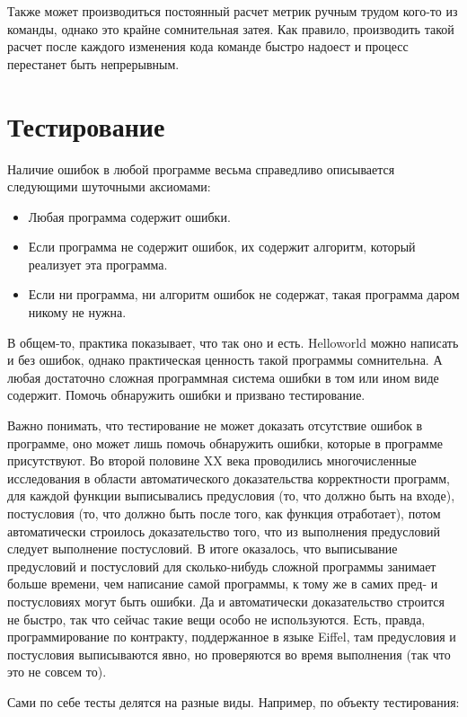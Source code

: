 \documentclass{../../text-style}
\begin{document}
Также может производиться постоянный расчет метрик ручным трудом кого-то из команды, однако это крайне сомнительная затея. Как правило, производить такой расчет после каждого изменения кода команде быстро надоест и процесс перестанет быть непрерывным.

\section{Тестирование}

Наличие ошибок в любой программе весьма справедливо описывается следующими шуточными аксиомами:

\begin{itemize}
    \item Любая программа содержит ошибки.
    \item Если программа не содержит ошибок, их содержит алгоритм, который реализует эта программа.
    \item Если ни программа, ни алгоритм ошибок не содержат, такая программа даром никому не нужна.
\end{itemize}

В общем-то, практика показывает, что так оно и есть. Helloworld можно написать и без ошибок, однако практическая ценность такой программы сомнительна. А любая достаточно сложная программная система ошибки в том или ином виде содержит. Помочь обнаружить ошибки и призвано тестирование.

Важно понимать, что тестирование не может доказать отсутствие ошибок в программе, оно может лишь помочь обнаружить ошибки, которые в программе присутствуют. Во второй половине XX века проводились многочисленные исследования в области автоматического доказательства корректности программ, для каждой функции выписывались предусловия (то, что должно быть на входе), постусловия (то, что должно быть после того, как функция отработает), потом автоматически строилось доказательство того, что из выполнения предусловий следует выполнение постусловий. В итоге оказалось, что выписывание предусловий и постусловий для сколько-нибудь сложной программы занимает больше времени, чем написание самой программы, к тому же в самих пред- и постусловиях могут быть ошибки. Да и автоматически доказательство строится не быстро, так что сейчас такие вещи особо не используются. Есть, правда, программирование по контракту, поддержанное в языке Eiffel, там предусловия и постусловия выписываются явно, но проверяются во время выполнения (так что это не совсем то).

Сами по себе тесты делятся на разные виды. Например, по объекту тестирования:
\end{document}
